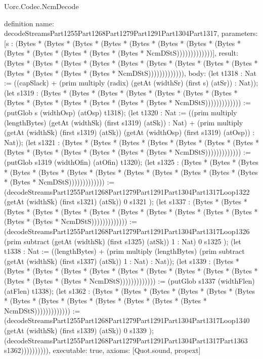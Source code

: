 \begin{lexlean}{Uorc.Codec.NcmDecode}
\begin{semanticmodule}
definition{
  name: decodeStreamsPart1255Part1268Part1279Part1291Part1304Part1317,
  parameters: [s : (Bytes * (Bytes * (Bytes * (Bytes * (Bytes * (Bytes * (Bytes * (Bytes * (Bytes * (Bytes * (Bytes * (Bytes * (Bytes * NcmDStS)))))))))))))],
  result: (Bytes * (Bytes * (Bytes * (Bytes * (Bytes * (Bytes * (Bytes * (Bytes * (Bytes * (Bytes * (Bytes * (Bytes * (Bytes * NcmDStS))))))))))))),
  body: (let t1318 : Nat := ((capSlack) + (prim multiply (radix) (getAt (widthSr) (first s) (atSr)) : Nat)); (let s1319 : (Bytes * (Bytes * (Bytes * (Bytes * (Bytes * (Bytes * (Bytes * (Bytes * (Bytes * (Bytes * (Bytes * (Bytes * (Bytes * NcmDStS))))))))))))) := (putGlob s (widthOsp) (atOsp) t1318); (let t1320 : Nat := ((prim multiply (lengthBytes) (getAt (widthSk) (first s1319) (atSk)) : Nat) + (prim multiply (getAt (widthSk) (first s1319) (atSk)) (getAt (widthOsp) (first s1319) (atOsp)) : Nat)); (let s1321 : (Bytes * (Bytes * (Bytes * (Bytes * (Bytes * (Bytes * (Bytes * (Bytes * (Bytes * (Bytes * (Bytes * (Bytes * (Bytes * NcmDStS))))))))))))) := (putGlob s1319 (widthOfin) (atOfin) t1320); (let s1325 : (Bytes * (Bytes * (Bytes * (Bytes * (Bytes * (Bytes * (Bytes * (Bytes * (Bytes * (Bytes * (Bytes * (Bytes * (Bytes * NcmDStS))))))))))))) := (decodeStreamsPart1255Part1268Part1279Part1291Part1304Part1317Loop1322 (getAt (widthSk) (first s1321) (atSk)) 0 s1321 ); (let s1337 : (Bytes * (Bytes * (Bytes * (Bytes * (Bytes * (Bytes * (Bytes * (Bytes * (Bytes * (Bytes * (Bytes * (Bytes * (Bytes * NcmDStS))))))))))))) := (decodeStreamsPart1255Part1268Part1279Part1291Part1304Part1317Loop1326 (prim subtract (getAt (widthSk) (first s1325) (atSk)) 1 : Nat) 0 s1325 ); (let t1338 : Nat := ((lengthBytes) + (prim multiply (lengthBytes) (prim subtract (getAt (widthSk) (first s1337) (atSk)) 1 : Nat) : Nat)); (let s1339 : (Bytes * (Bytes * (Bytes * (Bytes * (Bytes * (Bytes * (Bytes * (Bytes * (Bytes * (Bytes * (Bytes * (Bytes * (Bytes * NcmDStS))))))))))))) := (putGlob s1337 (widthFlen) (atFlen) t1338); (let s1362 : (Bytes * (Bytes * (Bytes * (Bytes * (Bytes * (Bytes * (Bytes * (Bytes * (Bytes * (Bytes * (Bytes * (Bytes * (Bytes * NcmDStS))))))))))))) := (decodeStreamsPart1255Part1268Part1279Part1291Part1304Part1317Loop1340 (getAt (widthSk) (first s1339) (atSk)) 0 s1339 ); (decodeStreamsPart1255Part1268Part1279Part1291Part1304Part1317Part1363 s1362)))))))))),
  executable: true,
  axioms: [Quot.sound, propext]
}


\end{semanticmodule}
\end{lexlean}
